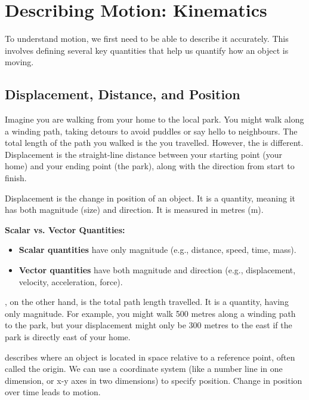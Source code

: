 \section{Describing Motion: Kinematics}

To understand motion, we first need to be able to describe it accurately.  This involves defining several key quantities that help us quantify how an object is moving.

\subsection{Displacement, Distance, and Position}

Imagine you are walking from your home to the local park.  You might walk along a winding path, taking detours to avoid puddles or say hello to neighbours. The total length of the path you walked is the  you travelled.  However, the  is different. Displacement is the straight-line distance between your starting point (your home) and your ending point (the park), along with the direction from start to finish.

\begin{keyconcept}{Displacement}
 is the change in position of an object. It is a  quantity, meaning it has both magnitude (size) and direction.  It is measured in metres (m).
\end{keyconcept}

\begin{marginnote}
\textbf{Scalar vs. Vector Quantities:}
\begin{itemize}
    \item \textbf{Scalar quantities} have only magnitude (e.g., distance, speed, time, mass).
    \item \textbf{Vector quantities} have both magnitude and direction (e.g., displacement, velocity, acceleration, force).
\end{itemize}
\end{marginnote}

, on the other hand, is the total path length travelled. It is a  quantity, having only magnitude.  For example, you might walk 500 metres along a winding path to the park, but your displacement might only be 300 metres to the east if the park is directly east of your home.

 describes where an object is located in space relative to a reference point, often called the origin.  We can use a coordinate system (like a number line in one dimension, or x-y axes in two dimensions) to specify position. Change in position over time leads to motion.


